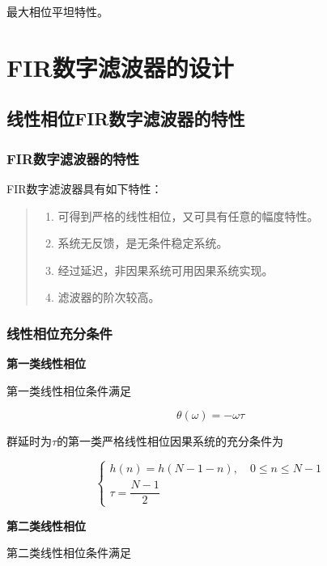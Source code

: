 \documentclass[cn, hazy, blue, normal, 14pt]{elegantnote}
\begin{document}
最大相位平坦特性。

\section{FIR数字滤波器的设计}

\subsection{线性相位FIR数字滤波器的特性}

\subsubsection{FIR数字滤波器的特性}

FIR数字滤波器具有如下特性：

\begin{quote}
\begin{enumerate}
    \item 可得到严格的线性相位，又可具有任意的幅度特性。 
    \item 系统无反馈，是无条件稳定系统。
    \item 经过延迟，非因果系统可用因果系统实现。
    \item 滤波器的阶次较高。
\end{enumerate}
\end{quote}

\subsubsection{线性相位充分条件}

\textbf{第一类线性相位}

第一类线性相位条件满足

\begin{equation}
    \theta(\omega)=-\omega\tau
\end{equation}

群延时为$\tau$的第一类严格线性相位因果系统的充分条件为

\begin{equation}
    \left\{
    \begin{array}{l}
        h(n)=h(N-1-n), \quad 0\leq n\leq N-1 \\
        \tau=\dfrac{N-1}{2}
    \end{array}
    \right.
\end{equation}

\textbf{第二类线性相位}

第二类线性相位条件满足
\end{document}
